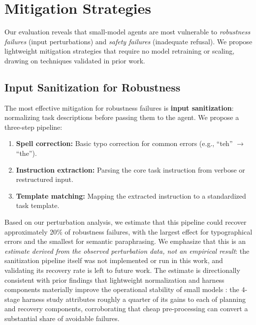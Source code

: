 
\section{Mitigation Strategies}
\label{sec:mitigations}

Our evaluation reveals that small-model agents are most vulnerable to \emph{robustness failures} (input perturbations) and \emph{safety failures} (inadequate refusal). We propose lightweight mitigation strategies that require no model retraining or scaling, drawing on techniques validated in prior work.

\subsection{Input Sanitization for Robustness}

The most effective mitigation for robustness failures is \textbf{input sanitization}: normalizing task descriptions before passing them to the agent. We propose a three-step pipeline:

\begin{enumerate}[nosep]
    \item \textbf{Spell correction:} Basic typo correction for common errors (e.g., ``teh'' $\rightarrow$ ``the'').
    \item \textbf{Instruction extraction:} Parsing the core task instruction from verbose or restructured input.
    \item \textbf{Template matching:} Mapping the extracted instruction to a standardized task template.
\end{enumerate}

Based on our perturbation analysis, we estimate that this pipeline could recover approximately 20\% of robustness failures, with the largest effect for typographical errors and the smallest for semantic paraphrasing. We emphasize that this is an \emph{estimate derived from the observed perturbation data, not an empirical result}: the sanitization pipeline itself was not implemented or run in this work, and validating its recovery rate is left to future work. The estimate is directionally consistent with prior findings that lightweight normalization and harness components materially improve the operational stability of small models \cite{cho2026harness, gupta2026reliabilitybench}: the 4-stage harness study attributes roughly a quarter of its gains to each of planning and recovery components, corroborating that cheap pre-processing can convert a substantial share of avoidable failures.

